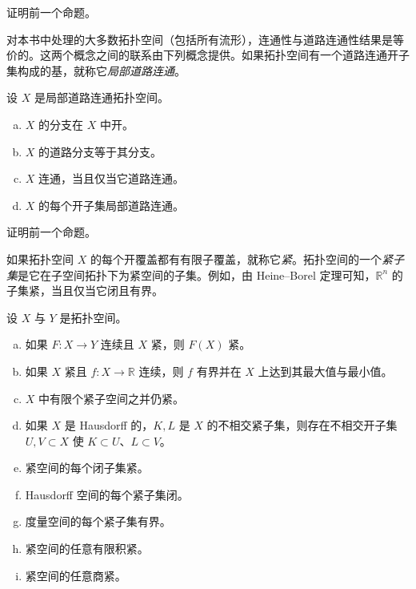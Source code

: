 \documentclass[../../main.tex]{subfiles}
\begin{document}
\begin{exercise}\label{exercise:appA-A-42}
证明前一个命题。
\end{exercise}

对本书中处理的大多数拓扑空间（包括所有流形），连通性与道路连通性结果是等价的。这两个概念之间的联系由下列概念提供。如果拓扑空间有一个道路连通开子集构成的基，就称它\emph{局部道路连通}。

\begin{proposition}[局部道路连通空间的性质]\label{proposition:appA-locally-path-connected}
设 $X$ 是局部道路连通拓扑空间。
\begin{enumerate}[(a)]
\item $X$ 的分支在 $X$ 中开。
\item $X$ 的道路分支等于其分支。
\item $X$ 连通，当且仅当它道路连通。
\item $X$ 的每个开子集局部道路连通。
\end{enumerate}
\end{proposition}

\begin{exercise}\label{exercise:appA-A-44}
证明前一个命题。
\end{exercise}

如果拓扑空间 $X$ 的每个开覆盖都有有限子覆盖，就称它\emph{紧}。拓扑空间的一个\emph{紧子集}是它在子空间拓扑下为紧空间的子集。例如，由 Heine--Borel 定理可知，$\mathbb R^n$ 的子集紧，当且仅当它闭且有界。

\begin{proposition}[紧空间的性质]\label{proposition:appA-compact-properties}
设 $X$ 与 $Y$ 是拓扑空间。
\begin{enumerate}[(a)]
\item 如果 $F:X\to Y$ 连续且 $X$ 紧，则 $F(X)$ 紧。
\item 如果 $X$ 紧且 $f:X\to\mathbb R$ 连续，则 $f$ 有界并在 $X$ 上达到其最大值与最小值。
\item $X$ 中有限个紧子空间之并仍紧。
\item 如果 $X$ 是 Hausdorff 的，$K,L$ 是 $X$ 的不相交紧子集，则存在不相交开子集 $U,V\subset X$ 使 $K\subset U$、$L\subset V$。
\item 紧空间的每个闭子集紧。
\item Hausdorff 空间的每个紧子集闭。
\item 度量空间的每个紧子集有界。
\item 紧空间的任意有限积紧。
\item 紧空间的任意商紧。
\end{enumerate}
\end{proposition}
\end{document}
